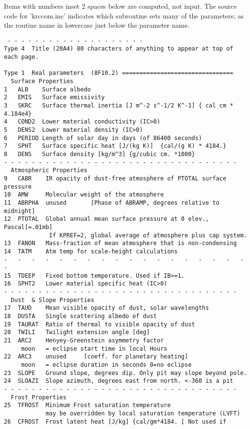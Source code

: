 \documentclass[draft]{article}  %
\begin{document}
Items with numbers inset 2 spaces below are computed, not input.                
The source code for 'krccom.inc' indicates which subroutine sets many of the 
parameters; as the routine name in lowercase just below the parameter name.
\vspace{-3.mm} 
\begin{verbatim}
 - - - - - - - - - - - - - - - - - - - -
Type 4	Title (20A4) 80 characters of anything to appear at top of each page.

Type 1	Real parameters  (8F10.2) ================================
  Surface Properties
1   ALB    Surface albedo
2   EMIS   Surface emissivity
3   SKRC   Surface thermal inertia [J m^-2 s^-1/2 K^-1] { cal cm * 4.184e4}
4   COND2  Lower material conductivity (IC>0)
5   DENS2  Lower material density (IC>0)
6   PERIOD Length of solar day in days (of 86400 seconds)
7   SPHT   Surface specific heat [J/(kg K)]  {cal/(g K) * 4184.}
8   DENS   Surface density [kg/m^3] {g/cubic cm. *1000}
- - - - - - - - - - - - - - - - - - - - - - - - - - - - - - - - - - 
  Atmospheric Properties
9   CABR    IR opacity of dust-free atmosphere of PTOTAL surface pressure
10  AMW     Molecular weight of the atmosphere
11  ABRPHA  unused       [Phase of ABRAMP, degrees relative to midnight] 
12  PTOTAL  Global annual mean surface pressure at 0 elev., Pascal[=.01mb]
             If KPREF=2, global average of atmosphere plus cap system.
13  FANON   Mass-fraction of mean atmosphere that is non-condensing
14  TATM    Atm temp for scale-height calculations
-   -   -   -   -   -   -   -   -   -   -   -   -   -   -   -   -   -   -   
15  TDEEP   Fixed bottom temperature. Used if IB>=1.
16  SPHT2   Lower material specific heat (IC>0)
- - - - - - - - - - - - - - - - - - - - - - - - - - - - - - - - - - 
  Dust  & Slope Properties
17  TAUD    Mean visible opacity of dust, solar wavelengths
18  DUSTA   Single scattering albedo of dust
19  TAURAT  Ratio of thermal to visible opacity of dust
20  TWILI   Twilight extension angle [deg]
21  ARC2    Henyey-Greenstein asymmetry factor
     moon   = eclipse start time in local Hours
22  ARC3    unused     [coeff. for planetary heating] 
     moon   = eclipse duration in seconds 0=no eclipse
23  SLOPE   Ground slope, degrees dip. Only pit may slope beyond pole.
24  SLOAZI  Slope azimuth, degrees east from north. <-360 is a pit
- - - - - - - - - - - - - - - - - - - - - - - - - - - - - - - - - - 
  Frost Properties
25  TFROST  Minimum Frost saturation temperature
            may be overridden by local saturation temperature (LVFT)
26  CFROST  Frost latent heat [J/kg] {cal/gm*4184. [ Not used if

\end{verbatim}
\end{document}
